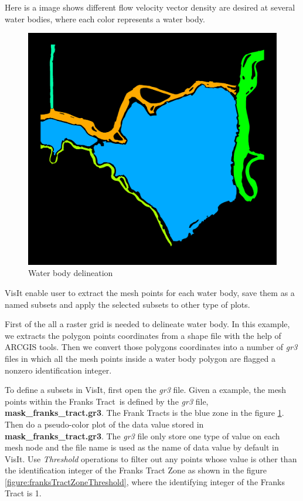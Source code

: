 \documentclass[12pt]{report}
\begin{document}
Here is a image shows different  flow velocity vector density are desired at several water bodies, where each color
represents a water body.
\begin{figure}
\begin{center}
\includegraphics{franksTractZones600}
\caption{Water body delineation }
\label{figure:franksTractZones}
\end{center}
\end{figure} 	

VisIt enable user to extract the mesh points for each water body, save them as a named subsets and apply
the selected subsets to other type of plots. 

First of the all a raster grid is needed  to delineate water body. In
this example, we extracts the polygon points coordinates from a shape file with the help of ARCGIS tools. Then we convert
those polygons coordinates into a number of \emph{gr3} files in which all the mesh points inside a water body polygon are
flagged a nonzero identification integer.

To define a subsets in VisIt, first open the \emph{gr3} file. Given a example, the mesh points within the Franks Tract\
is defined by the \emph{gr3} file, {\bf mask\_franks\_tract.gr3}. The Frank Tracts is the blue zone in the figure \ref {figure:franksTractZones}. Then do a pseudo-color plot of the data value stored in {\bf mask\_franks\_tract.gr3}. The \emph{gr3}
file only store one type of value on each mesh node and the file name is used as the name of data value by default in VisIt.
Use \emph{Threshold} operations to filter out any points whose value is other than the identification integer of the Franks
Tract Zone as shown in the figure \ref{figure:franksTractZoneThreshold}, where the identifying integer of the Franks Tract is
1.
\end{document}

